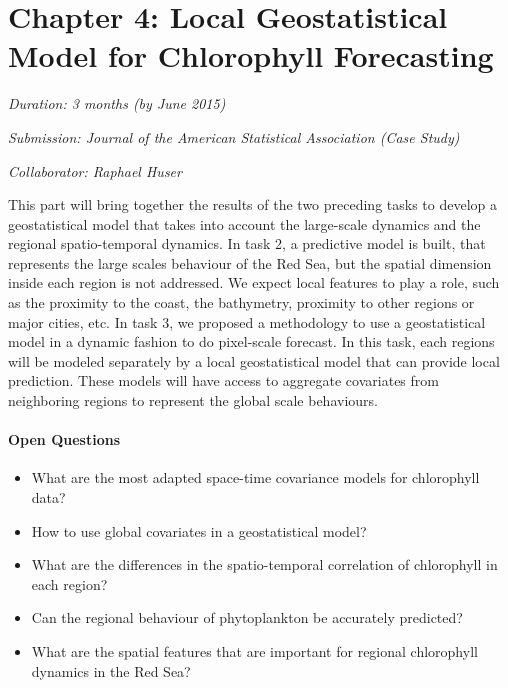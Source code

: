 \section{Chapter 4: Local Geostatistical Model for Chlorophyll Forecasting}

\noindent \emph{Duration: 3 months (by June 2015)}

\noindent \emph{Submission: Journal of the American Statistical Association
(Case Study)}

\noindent \emph{Collaborator: Raphael Huser}

\vspace{5mm}

This part will bring together the results of the two preceding tasks to develop
a geostatistical model that takes into account the large-scale dynamics and the
regional spatio-temporal dynamics. In task 2, a predictive model is built, that
represents the large scales behaviour of the Red Sea, but the spatial dimension
inside each region is not addressed. We expect local features to play a role,
such as the proximity to the coast, the bathymetry, proximity to other regions
or major cities, etc. In task 3, we proposed a methodology to use a
geostatistical model in a dynamic fashion to do pixel-scale forecast. In this
task, each regions will be modeled separately by a local geostatistical model
that can provide local prediction. These models will have access to aggregate
covariates from neighboring regions to represent the global scale behaviours. 

\paragraph{Open Questions}

\begin{itemize}

\item What are the most adapted space-time covariance models for chlorophyll
data?

\item How to use global covariates in a geostatistical model?

\item What are the differences in the spatio-temporal correlation of chlorophyll in
each region?

\item Can the regional behaviour of phytoplankton be accurately predicted?

\item What are the spatial features that are important for regional chlorophyll
dynamics in the Red Sea?

\end{itemize}

